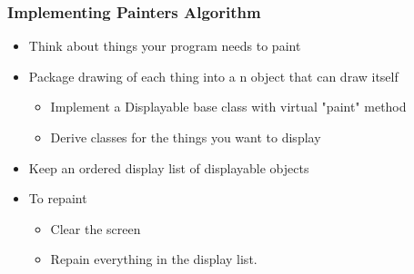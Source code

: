 \documentclass[twoside]{article}
\begin{document}
\subsubsection{Implementing Painters Algorithm}
\begin{itemize}
\item Think about things your program needs to paint 
\item Package drawing of each thing into a n object that can draw itself
\begin{itemize}
\item Implement a Displayable base class with virtual "paint" method 
\item Derive classes for the things you want to display
\end{itemize}
\item Keep an ordered display list of displayable objects
\item To repaint
\begin{itemize}
\item Clear the screen 
\item Repain everything in the display list. 
\end{itemize}
\end{itemize}
\end{document}
